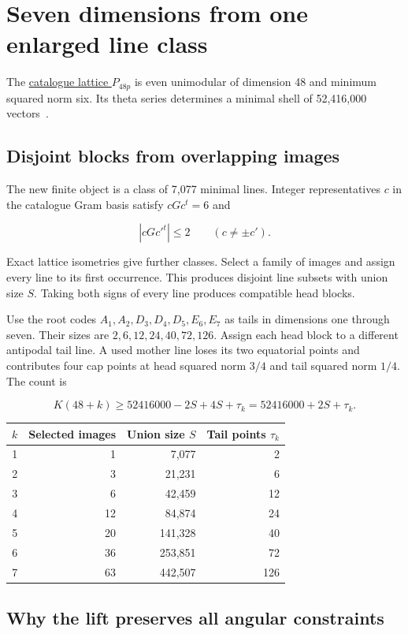 \section{Seven dimensions from one enlarged line
class}

The
\href{https://www.math.rwth-aachen.de/~Gabriele.Nebe/LATTICES/P48p.html}{catalogue
lattice \(P_{48p}\)} is even unimodular of dimension 48 and minimum
squared norm six. Its theta series determines a minimal shell of
52,416,000 vectors~\cite{p48p-catalogue,nebe}.

\subsection{Disjoint blocks from overlapping images}

The new finite object is a class of 7,077 minimal lines. Integer
representatives \(c\) in the catalogue Gram basis satisfy \(cGc^t=6\)
and

\[
|cGc'^t|\le2\qquad(c\ne\pm c').
\]

Exact lattice isometries give further classes. Select a family of images
and assign every line to its first occurrence. This produces disjoint
line subsets with union size \(S\). Taking both signs of every line
produces compatible head blocks.

Use the root codes \(A_1,A_2,D_3,D_4,D_5,E_6,E_7\) as tails in
dimensions one through seven. Their sizes are \(2,6,12,24,40,72,126\).
Assign each head block to a different antipodal tail line. A used mother
line loses its two equatorial points and contributes four cap points at
head squared norm \(3/4\) and tail squared norm \(1/4\). The count is

\[
K(48+k)\ge52416000-2S+4S+\tau_k=52416000+2S+\tau_k.
\]

\begin{longtable}[]{@{}rrrr@{}}
\toprule
\(k\) & Selected images & Union size \(S\) & Tail points
\(\tau_k\)\tabularnewline
\midrule
\endhead
1 & 1 & 7,077 & 2\tabularnewline
2 & 3 & 21,231 & 6\tabularnewline
3 & 6 & 42,459 & 12\tabularnewline
4 & 12 & 84,874 & 24\tabularnewline
5 & 20 & 141,328 & 40\tabularnewline
6 & 36 & 253,851 & 72\tabularnewline
7 & 63 & 442,507 & 126\tabularnewline
\bottomrule
\end{longtable}

\subsection{Why the lift preserves all angular constraints}

